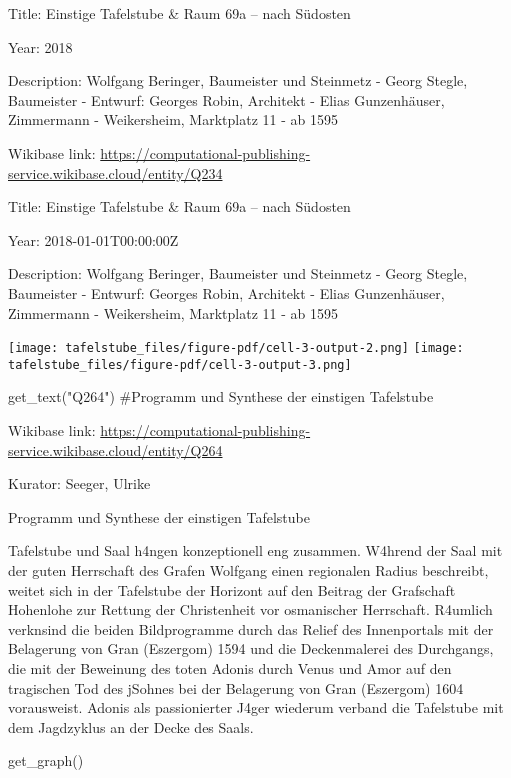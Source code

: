 \documentclass[
  letterpaper,
]{book}
\newenvironment{Shaded}{\begin{snugshade}}{\end{snugshade}}
\newcommand{\CommentTok}[1]{\textcolor[rgb]{0.37,0.37,0.37}{#1}}
\newcommand{\NormalTok}[1]{\textcolor[rgb]{0.00,0.23,0.31}{#1}}
\newcommand{\StringTok}[1]{\textcolor[rgb]{0.13,0.47,0.30}{#1}}
\begin{document}
Title: Einstige Tafelstube \& Raum 69a -- nach Südosten

Year: 2018

Description: Wolfgang Beringer, Baumeister und Steinmetz - Georg Stegle,
Baumeister - Entwurf: Georges Robin, Architekt - Elias Gunzenhäuser,
Zimmermann - Weikersheim, Marktplatz 11 - ab 1595

Wikibase link:
\url{https://computational-publishing-service.wikibase.cloud/entity/Q234}

Title: Einstige Tafelstube \& Raum 69a -- nach Südosten

Year: 2018-01-01T00:00:00Z

Description: Wolfgang Beringer, Baumeister und Steinmetz - Georg Stegle,
Baumeister - Entwurf: Georges Robin, Architekt - Elias Gunzenhäuser,
Zimmermann - Weikersheim, Marktplatz 11 - ab 1595

\texttt{[image: tafelstube\_files/figure-pdf/cell-3-output-2.png]}
\texttt{[image: tafelstube\_files/figure-pdf/cell-3-output-3.png]}

\begin{Shaded}
\begin{Highlighting}[]
\NormalTok{get\_text(}\StringTok{"Q264"}\NormalTok{)}
\CommentTok{\#Programm und Synthese der einstigen Tafelstube}
\end{Highlighting}
\end{Shaded}

Wikibase link:
\url{https://computational-publishing-service.wikibase.cloud/entity/Q264}

Kurator: Seeger, Ulrike

Programm und Synthese der einstigen Tafelstube

Tafelstube und Saal h\xa4ngen konzeptionell eng zusammen.
W\xa4hrend der Saal mit der guten Herrschaft des Grafen Wolfgang
einen regionalen Radius beschreibt, weitet sich in der Tafelstube der
Horizont auf den Beitrag der Grafschaft Hohenlohe zur Rettung der
Christenheit vor osmanischer Herrschaft. R\xa4umlich
verkn\xbcpft sind die beiden Bildprogramme durch das Relief des
Innenportals mit der Belagerung von Gran (Eszergom) 1594 und die
Deckenmalerei des Durchgangs, die mit der Beweinung des toten Adonis
durch Venus und Amor auf den tragischen Tod des j\xbcngsten Sohnes
bei der Belagerung von Gran (Eszergom) 1604 vorausweist. Adonis als
passionierter J\xa4ger wiederum verband die Tafelstube mit dem
Jagdzyklus an der Decke des Saals.

\begin{Shaded}
\begin{Highlighting}[]
\NormalTok{get\_graph()}
\end{Highlighting}
\end{Shaded}
\end{document}

